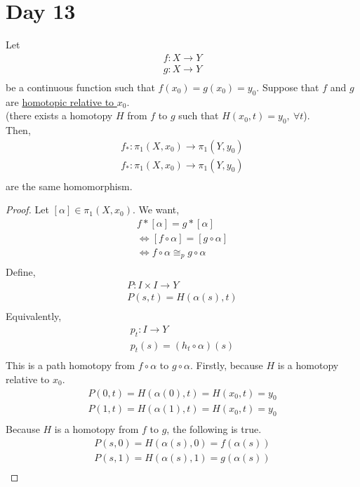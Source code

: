 \section{Day 13}
    \begin{theorem} 
        Let
        \begin{align*}
            f: X\rightarrow Y\\
            g: X\rightarrow Y\\
        \end{align*}
        be a continuous function such that $f(x_0)=g(x_0)=y_0$. Suppose that
        $f$ and $g$ are \underline{homotopic relative to $x_0$}.\\(there exists a homotopy
        $H$ from $f$ to $g$ such that $H(x_0, t)=y_0,\ \forall t$).\\
        Then,
        \begin{align*}
            f_*:\pi_1(X,x_0)\rightarrow \pi_1(Y,y_0)\\
            f_*:\pi_1(X,x_0)\rightarrow \pi_1(Y,y_0)\\
        \end{align*}
        are the same homomorphism.
    \end{theorem} 
    \begin{proof}
        Let $[\alpha]\in \pi_1(X,x_0)$. We want,
        \begin{align*}
            f*[\alpha]=g*[\alpha]\\
            \iff [f\circ \alpha]=[g\circ \alpha]\\
            \iff f\circ \alpha \cong_{p} g\circ\alpha\\
        \end{align*}
        Define,
        \begin{align*}
            P: I\times I \rightarrow Y\\
            P(s,t)=H(\alpha(s), t)\\
        \end{align*}
        Equivalently, 
        \begin{align*}
            p_t: I \rightarrow Y\\
            p_t(s)=(h_t\circ \alpha)(s)\\
        \end{align*}
        This is a path homotopy from $f\circ \alpha$ to $g\circ\alpha$.
        Firstly, because $H$ is a homotopy relative to $x_0$.
        \begin{align*}
            P(0,t)=H(\alpha(0),t)=H(x_0,t)=y_0\\
            P(1,t)=H(\alpha(1),t)=H(x_0,t)=y_0\\
        \end{align*}
        Because $H$ is a homotopy from $f$ to $g$, the following is true.
        \begin{align*}
            P(s,0)=H(\alpha(s),0)=f(\alpha(s))\\
            P(s,1)=H(\alpha(s),1)=g(\alpha(s))\\
        \end{align*}
    \end{proof}

